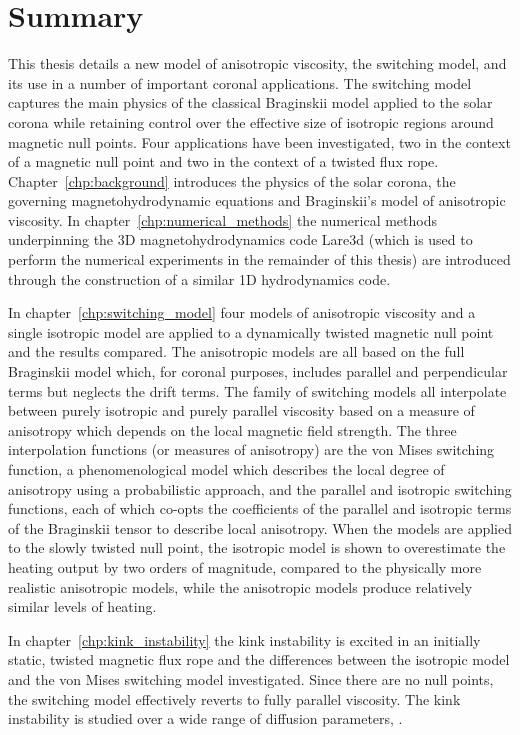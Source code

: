 \chapter{Summary}

\label{chp:summary}

This thesis details a new model of anisotropic viscosity, the switching model, and its use in a number of important coronal applications. The switching model captures the main physics of the classical Braginskii model applied to the solar corona while retaining control over the effective size of isotropic regions around magnetic null points. Four applications have been investigated, two in the context of a magnetic null point and two in the context of a twisted flux rope. Chapter~\ref{chp:background} introduces the physics of the solar corona, the governing magnetohydrodynamic equations and Braginskii's model of anisotropic viscosity. In chapter~\ref{chp:numerical_methods} the numerical methods underpinning the 3D magnetohydrodynamics code Lare3d (which is used to perform the numerical experiments in the remainder of this thesis) are introduced through the construction of a similar 1D hydrodynamics code.

In chapter~\ref{chp:switching_model} four models of anisotropic viscosity and a single isotropic model are applied to a dynamically twisted magnetic null point and the results compared. The anisotropic models are all based on the full Braginskii model which, for coronal purposes, includes parallel and perpendicular terms but neglects the drift terms. The family of switching models all interpolate between purely isotropic and purely parallel viscosity based on a measure of anisotropy which depends on the local magnetic field strength. The three interpolation functions (or measures of anisotropy) are the von Mises switching function, a phenomenological model which describes the local degree of anisotropy using a probabilistic approach, and the parallel and isotropic switching functions, each of which co-opts the coefficients of the parallel and isotropic terms of the Braginskii tensor to describe local anisotropy. When the models are applied to the slowly twisted null point, the isotropic model is shown to overestimate the heating output by two orders of magnitude, compared to the physically more realistic anisotropic models, while the anisotropic models produce relatively similar levels of heating.

In chapter~\ref{chp:kink_instability} the kink instability is excited in an initially static, twisted magnetic flux rope and the differences between the isotropic model and the von Mises switching model investigated. Since there are no null points, the switching model effectively reverts to fully parallel viscosity. The kink instability is studied over a wide range of diffusion parameters, .

